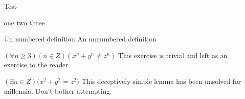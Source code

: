 \documentclass{article}
\begin{document}
\begin{boxDefinition}[sidebyside = false]{Test}

one two three

\end{boxDefinition}
\begin{boxDefinition*}{Un numbered definition}
An unnumbered definition
\end{boxDefinition*}

\begin{boxProof}{$(\forall n\geq 3)(n\in Z)(x^n + y^n \neq z^n)$}
    This exercise is trivial and left as an exercise to the reader
\end{boxProof}

\begin{boxProof}{{$(\exists n\in Z)(x^2 + y^2$ = $z^2)$}}
    This deceptively simple lemma has been unsolved for millennia. Don't bother attempting.
\end{boxProof}
\end{document}
